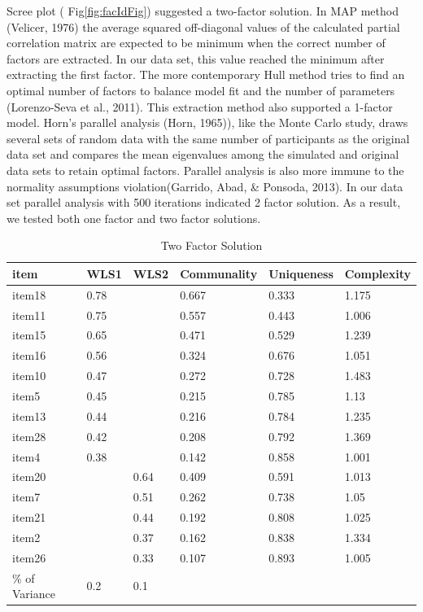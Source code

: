 \documentclass[
  english,
  man]{apa6}
\begin{document}
Scree plot ( Fig\ref{fig:facIdFig}) suggested a two-factor solution. In MAP method (Velicer, 1976) the average squared off-diagonal values of the calculated partial correlation matrix are expected to be minimum when the correct number of factors are extracted. In our data set, this value reached the minimum after extracting the first factor. The more contemporary Hull method tries to find an optimal number of factors to balance model fit and the number of parameters (Lorenzo-Seva et al., 2011). This extraction method also supported a 1-factor model. Horn's parallel analysis (Horn, 1965)), like the Monte Carlo study, draws several sets of random data with the same number of participants as the original data set and compares the mean eigenvalues among the simulated and original data sets to retain optimal factors. Parallel analysis is also more immune to the normality assumptions violation(Garrido, Abad, \& Ponsoda, 2013). In our data set parallel analysis with 500 iterations indicated 2 factor solution. As a result, we tested both one factor and two factor solutions.

\begin{table}[tbp]

\begin{center}
\begin{threeparttable}

\caption{\label{tab:TabEFA2}Two Factor Solution}

\begin{tabular}{llllll}
\toprule
item & \multicolumn{1}{c}{WLS1} & \multicolumn{1}{c}{WLS2} & \multicolumn{1}{c}{Communality} & \multicolumn{1}{c}{Uniqueness} & \multicolumn{1}{c}{Complexity}\\
\midrule
item18 & 0.78 &  & 0.667 & 0.333 & 1.175\\
item11 & 0.75 &  & 0.557 & 0.443 & 1.006\\
item15 & 0.65 &  & 0.471 & 0.529 & 1.239\\
item16 & 0.56 &  & 0.324 & 0.676 & 1.051\\
item10 & 0.47 &  & 0.272 & 0.728 & 1.483\\
item5 & 0.45 &  & 0.215 & 0.785 & 1.13\\
item13 & 0.44 &  & 0.216 & 0.784 & 1.235\\
item28 & 0.42 &  & 0.208 & 0.792 & 1.369\\
item4 & 0.38 &  & 0.142 & 0.858 & 1.001\\
item20 &  & 0.64 & 0.409 & 0.591 & 1.013\\
item7 &  & 0.51 & 0.262 & 0.738 & 1.05\\
item21 &  & 0.44 & 0.192 & 0.808 & 1.025\\
item2 &  & 0.37 & 0.162 & 0.838 & 1.334\\
item26 &  & 0.33 & 0.107 & 0.893 & 1.005\\
\% of Variance & 0.2 & 0.1 &  &  & \\
\bottomrule
\end{tabular}

\end{threeparttable}
\end{center}

\end{table}
\end{document}
